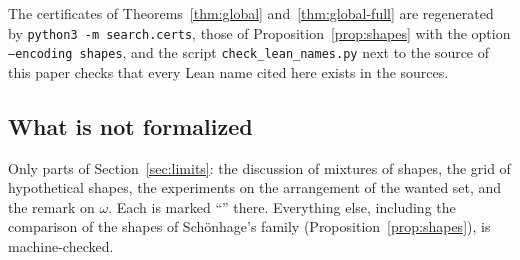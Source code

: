 The certificates of Theorems~\ref{thm:global} and~\ref{thm:global-full} are
regenerated by \texttt{python3 -m search.certs}, those of
Proposition~\ref{prop:shapes} with the option \texttt{--encoding shapes}, and
the script
\texttt{check\_lean\_names.py} next to the source of this paper checks that
every Lean name cited here exists in the sources.

\subsection{What is not formalized}

Only parts of Section~\ref{sec:limits}: the discussion of mixtures of
shapes, the grid of hypothetical shapes, the experiments on the arrangement of
the wanted set, and the remark on \(\omega\).  Each is marked ``\nf'' there.
Everything else, including the comparison of the shapes of Sch\"onhage's
family (Proposition~\ref{prop:shapes}), is machine-checked.
